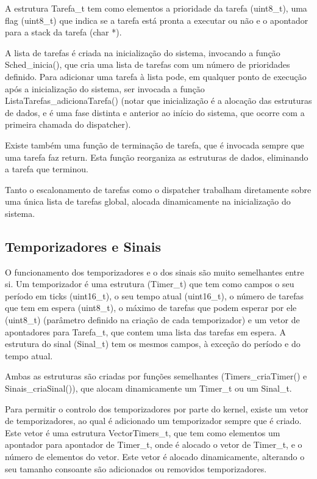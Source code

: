 \documentclass[journal]{IEEEtran}
\begin{document}
A estrutura Tarefa\_t tem como elementos a prioridade da tarefa (uint8\_t), uma flag (uint8\_t) que indica se a tarefa está pronta a executar ou não e o apontador para a
stack da tarefa (char *).

A lista de tarefas é criada na inicialização do sistema, invocando a função Sched\_inicia(), que cria uma lista de tarefas com um número de prioridades definido.
Para adicionar uma tarefa à lista pode, em qualquer ponto de execução após a inicialização do sistema, ser invocada a função ListaTarefas\_adicionaTarefa() (notar que inicialização é a
alocação das estruturas de dados, e é uma fase distinta e anterior ao início do sistema, que ocorre com a primeira chamada do dispatcher).

Existe também uma função de terminação de tarefa, que é invocada sempre que uma tarefa faz return.
Esta função reorganiza as estruturas de dados, eliminando a tarefa que terminou.

Tanto o escalonamento de tarefas como o dispatcher trabalham diretamente sobre uma única lista de tarefas global, alocada dinamicamente na inicialização do sistema.

\subsection{Temporizadores e Sinais}
O funcionamento dos temporizadores e o dos sinais são muito semelhantes entre si.
Um temporizador é uma estrutura (Timer\_t) que tem como campos o seu período em ticks (uint16\_t), o seu tempo atual (uint16\_t), o número de tarefas que tem em espera (uint8\_t),
o máximo de tarefas que podem esperar por ele (uint8\_t) (parâmetro definido na criação de cada temporizador) e um vetor de apontadores para Tarefa\_t, que contem uma
lista das tarefas em espera.
A estrutura do sinal (Sinal\_t) tem os mesmos campos, à exceção do período e do tempo atual.

Ambas as estruturas são criadas por funções semelhantes (\mbox{Timers\_criaTimer()} e \mbox{Sinais\_criaSinal()}), que alocam dinamicamente um Timer\_t ou um Sinal\_t.

Para permitir o controlo dos temporizadores por parte do kernel, existe um vetor de temporizadores, ao qual é adicionado um temporizador sempre que é criado.
Este vetor é uma estrutura VectorTimers\_t, que tem como elementos um apontador para apontador de Timer\_t, onde é alocado o vetor de Timer\_t, e o número de elementos do
vetor.
Este vetor é alocado dinamicamente, alterando o seu tamanho consoante são adicionados ou removidos temporizadores.
\end{document}
